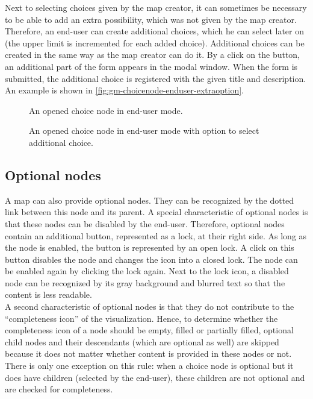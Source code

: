 Next to selecting choices given by the map creator, it can sometimes be necessary to be able to add an extra possibility, which was not given by the map creator. Therefore, an end-user can create additional choices, which he can select later on (the upper limit is incremented for each added choice). Additional choices can be created in the same way as the map creator can do it. By a click on the button, an additional part of the form appears in the modal window. When the form is submitted, the additional choice is registered with the given title and description. An example is shown in \autoref{fig:gm-choicenode-enduser-extraoption}.
\begin{figure}[H]
	\centering
	\caption{An opened choice node in end-user mode.}
	\label{fig:gm-choicenode-enduser}
\end{figure}

\begin{figure}[H]
	\centering
	\caption{An opened choice node in end-user mode with option to select additional choice.}
	\label{fig:gm-choicenode-enduser-extraoption}
\end{figure}



\subsection{Optional nodes}\label{sec:optional-nodes}
A map can also provide optional nodes. They can be recognized by the dotted link between this node and its parent. A special characteristic of optional nodes is that these nodes can be disabled by the end-user. Therefore, optional nodes contain an additional button, represented as a lock, at their right side. As long as the node is enabled, the button is represented by an open lock. A click on this button disables the node and changes the icon into a closed lock. The node can be enabled again by clicking the lock again. Next to the lock icon, a disabled node can be recognized by its gray background and blurred text so that the content is less readable.\\

A second characteristic of optional nodes is that they do not contribute to the ``completeness icon'' of the visualization. Hence, to determine whether the completeness icon of a node should be empty, filled or partially filled, optional child nodes and their descendants (which are optional as well) are skipped because it does not matter whether content is provided in these nodes or not. There is only one exception on this rule: when a choice node is optional but it does have children (selected by the end-user), these children are not optional and are checked for completeness.














